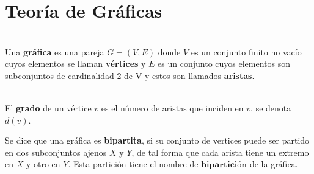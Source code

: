 \chapter{Teoría de Gráficas}

\begin{dfn} \cite{Yo} \\
Una \textbf{gráfica} es una pareja $G = (V, E)$ donde $V$ es un conjunto finito no vacío
cuyos elementos se llaman \textbf{vértices} y $E$ es un conjunto cuyos elementos son subconjuntos de
cardinalidad 2 de V y estos son llamados \textbf{aristas}.
\end{dfn}

\begin{dfn} \cite{Yo} \\ 
El \textbf{grado} de un vértice $v$ es el número de aristas que inciden en $v$, se denota $d(v)$.
\end{dfn}

\begin{dfn} \cite{Ramon}
Se dice que una gráfica es \textbf{bipartita}, si su conjunto de vertices puede ser partido en dos subconjuntos ajenos $X$ y $Y$, de tal forma que cada arista tiene un extremo en $X$ y otro en $Y$. Esta partición tiene el nombre de $\textbf{bipartición}$ de la gráfica.
\end{dfn}

